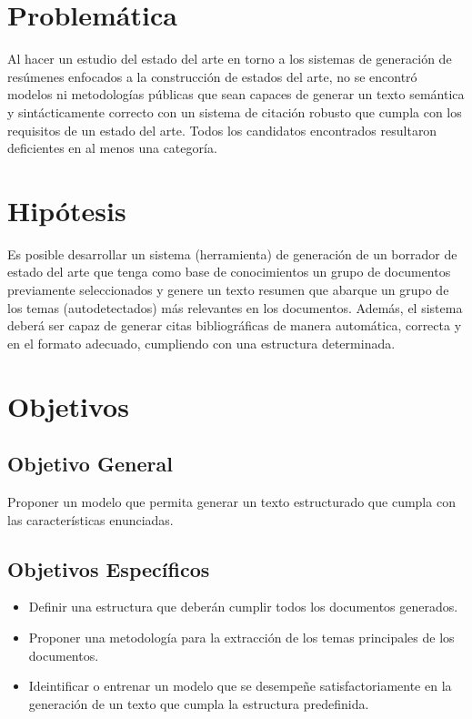 \section{Problemática}
    Al hacer un estudio del estado del arte en torno a los sistemas de generación de resúmenes enfocados a la construcción de estados del arte, no se encontró modelos ni metodologías públicas que sean capaces de generar un texto semántica y sintácticamente correcto con un sistema de citación robusto que cumpla con los requisitos de un estado del arte. Todos los candidatos encontrados resultaron deficientes en al menos una categoría.

\section{Hipótesis}
    Es posible desarrollar un sistema (herramienta) de generación de un borrador de estado del arte que tenga como base de conocimientos un grupo de documentos previamente seleccionados y genere un texto resumen que abarque un grupo de los temas (autodetectados) más relevantes en los documentos. Además, el sistema deberá ser capaz de generar citas bibliográficas de manera automática, correcta y en el formato adecuado, cumpliendo con una estructura determinada.

\section{Objetivos}
    \subsection{Objetivo General}

        Proponer un modelo que permita generar un texto estructurado que cumpla con las características enunciadas.

    \subsection{Objetivos Específicos}

        \begin{itemize}
            \item Definir una estructura que deberán cumplir todos los documentos generados.
            \item Proponer una metodología para la extracción de los temas principales de los documentos.
            \item Ideintificar o entrenar un modelo que se desempeñe satisfactoriamente en la generación de un texto que cumpla la estructura predefinida.
        \end{itemize}
